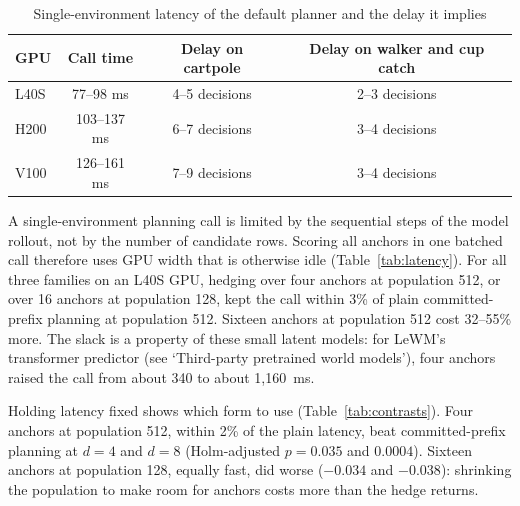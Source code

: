 \documentclass[aps,physrev,\manuscriptlayout,superscriptaddress,
  longbibliography,amsmath,amssymb]{revtex4-2}
\begin{document}
\begin{table}[t]
\centering
\caption{Single-environment latency of the default planner and the delay it implies}\label{tab:gpu}
\begin{tabular*}{\textwidth}{@{\extracolsep\fill}lccc@{}}
\toprule
GPU & Call time & Delay on cartpole & Delay on walker and cup catch \\
\midrule
L40S & 77--98 ms & 4--5 decisions & 2--3 decisions \\
H200 & 103--137 ms & 6--7 decisions & 3--4 decisions \\
V100 & 126--161 ms & 7--9 decisions & 3--4 decisions \\
\bottomrule
\end{tabular*}

\par{}
\end{table}

A single-environment planning call is limited by the sequential steps of the model rollout, not by the number of candidate rows. Scoring all anchors in one batched call therefore uses GPU width that is otherwise idle (Table~\ref{tab:latency}). For all three families on an L40S GPU, hedging over four anchors at population 512, or over 16 anchors at population 128, kept the call within 3\% of plain committed-prefix planning at population 512. Sixteen anchors at population 512 cost 32--55\% more. The slack is a property of these small latent models: for LeWM's transformer predictor (see `Third-party pretrained world models'), four anchors raised the call from about 340 to about 1,160~ms.

Holding latency fixed shows which form to use (Table~\ref{tab:contrasts}). Four anchors at population 512, within 2\% of the plain latency, beat committed-prefix planning at $d=4$ and $d=8$ (Holm-adjusted $p=0.035$ and $0.0004$). Sixteen anchors at population 128, equally fast, did worse ($-0.034$ and $-0.038$): shrinking the population to make room for anchors costs more than the hedge returns.
\end{document}
